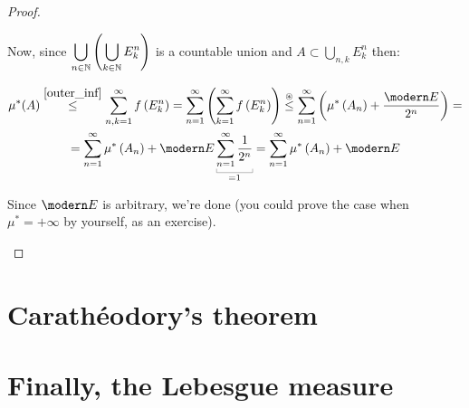 \begin{proof}
\begin{itemize}
    Now, since $\displaystyle\bigcup_{n\in\mathbb{N}}\left( \bigcup_{k\in\mathbb{N}} E_k^n \right)$ is a countable union and $A\subset\displaystyle\bigcup_{n,k}E_k^n$ then:

    \begin{gather*}
    \mu^*(A)\overset{\eqref{outer_inf}}{\leq} \sum^{\infty}_{n,k=1} f\left( E_k^n \right)=\sum^{\infty}_{n=1} \left( \sum^{\infty}_{k=1} f\left( E_k^n \right) \right)\overset{\circledast}{\leq} \sum^{\infty}_{n=1} \left( \mu^*\left( A_n \right)+\frac{\Ec}{2^n} \right) = \\
    =\sum^{\infty}_{n=1} \mu^*\left( A_n \right) + \Ec \underbracket[0.2pt]{\sum^{\infty}_{n=1} \frac{1}{2^n}}_{=1} =  \sum^{\infty}_{n=1} \mu^*\left( A_n \right) + \Ec 
    \end{gather*}

    Since $\Ec$ is arbitrary, we're done (you could prove the case when $\mu^*=+\infty$ by yourself, as an exercise).
\end{itemize}
\end{proof}

\newpage


\section{Carathéodory's theorem} %
\label{sec:carathéodory_s_theorem}


\section{Finally, the Lebesgue measure} %
\label{sec:finally_the_lebesgue_measure}


